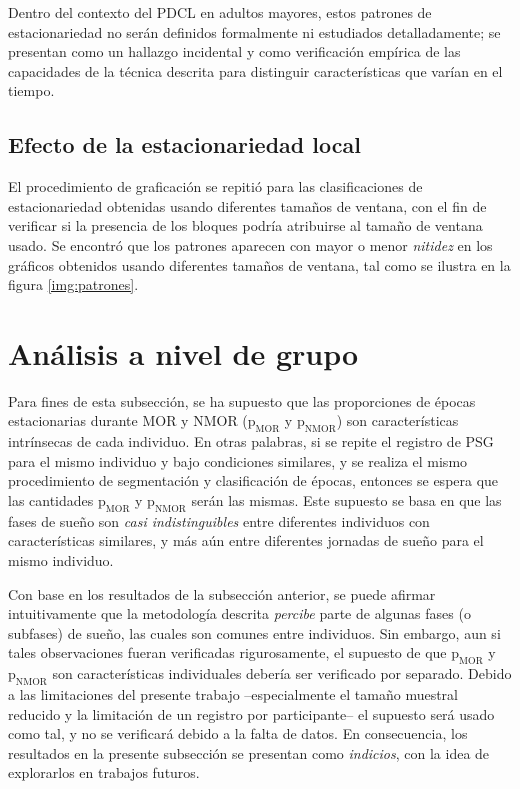 \documentclass[12pt,letterpaper]{book}
\begin{document}
Dentro del contexto del PDCL en adultos mayores, estos patrones de estacionariedad no serán definidos formalmente ni estudiados detalladamente; se presentan como un hallazgo incidental y como verificación empírica de las capacidades de la técnica descrita para distinguir características que varían en el tiempo.


\subsection*{Efecto de la estacionariedad local}

El procedimiento de graficación se repitió para las clasificaciones de estacionariedad obtenidas usando diferentes tamaños de ventana, con el fin de verificar si la presencia de los bloques podría atribuirse al tamaño de ventana usado.
%
Se encontró que los patrones aparecen con mayor o menor \textit{nitidez} en los gráficos obtenidos usando diferentes tamaños de ventana, tal como se ilustra en la figura \ref{img:patrones}.


\section{Análisis a nivel de grupo}

Para fines de esta subsección, se ha supuesto que las proporciones de épocas estacionarias durante MOR y NMOR ($\text{p}_{\text{MOR}}$ y $\text{p}_{\text{NMOR}}$) son características intrínsecas de cada individuo. 
%
En otras palabras, si se repite el registro de PSG para el mismo individuo y bajo condiciones similares, y se realiza el mismo procedimiento de segmentación y clasificación de épocas, entonces se espera que las cantidades $\text{p}_{\text{MOR}}$ y $\text{p}_{\text{NMOR}}$ serán las mismas.
%
Este supuesto se basa en que las fases de sueño son \textit{casi indistinguibles} entre diferentes individuos con características similares, y más aún entre diferentes jornadas de sueño para el mismo individuo.

Con base en los resultados de la subsección anterior, se puede afirmar intuitivamente que la metodología descrita \textit{percibe} parte de algunas fases (o subfases) de sueño, las cuales son comunes entre individuos.
%
Sin embargo, aun si tales observaciones fueran verificadas rigurosamente, el supuesto de que $\text{p}_{\text{MOR}}$ y $\text{p}_{\text{NMOR}}$ son características individuales debería ser verificado por separado.
%
Debido a las limitaciones del presente trabajo --especialmente el tamaño muestral reducido y la limitación de un registro por participante-- el supuesto será usado como tal, y no se verificará debido a la falta de datos.
%
En consecuencia, los resultados en la presente subsección se presentan como \textit{indicios}, con la idea de explorarlos en trabajos futuros.
\end{document}
